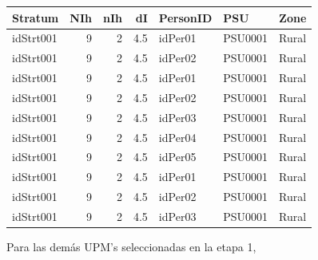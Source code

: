 \documentclass[
  12pt,
]{book}
\newenvironment{Shaded}{\begin{snugshade}}{\end{snugshade}}
\newcommand{\AttributeTok}[1]{\textcolor[rgb]{0.77,0.63,0.00}{#1}}
\newcommand{\ControlFlowTok}[1]{\textcolor[rgb]{0.13,0.29,0.53}{\textbf{#1}}}
\newcommand{\DecValTok}[1]{\textcolor[rgb]{0.00,0.00,0.81}{#1}}
\newcommand{\FunctionTok}[1]{\textcolor[rgb]{0.00,0.00,0.00}{#1}}
\newcommand{\NormalTok}[1]{#1}
\newcommand{\OtherTok}[1]{\textcolor[rgb]{0.56,0.35,0.01}{#1}}
\newcommand{\SpecialCharTok}[1]{\textcolor[rgb]{0.00,0.00,0.00}{#1}}
\newcommand{\StringTok}[1]{\textcolor[rgb]{0.31,0.60,0.02}{#1}}
\begin{document}
\begin{tabular}{l|r|r|r|l|l|l}
\hline
Stratum & NIh & nIh & dI & PersonID & PSU & Zone\\
\hline
idStrt001 & 9 & 2 & 4.5 & idPer01 & PSU0001 & Rural\\
\hline
idStrt001 & 9 & 2 & 4.5 & idPer02 & PSU0001 & Rural\\
\hline
idStrt001 & 9 & 2 & 4.5 & idPer01 & PSU0001 & Rural\\
\hline
idStrt001 & 9 & 2 & 4.5 & idPer02 & PSU0001 & Rural\\
\hline
idStrt001 & 9 & 2 & 4.5 & idPer03 & PSU0001 & Rural\\
\hline
idStrt001 & 9 & 2 & 4.5 & idPer04 & PSU0001 & Rural\\
\hline
idStrt001 & 9 & 2 & 4.5 & idPer05 & PSU0001 & Rural\\
\hline
idStrt001 & 9 & 2 & 4.5 & idPer01 & PSU0001 & Rural\\
\hline
idStrt001 & 9 & 2 & 4.5 & idPer02 & PSU0001 & Rural\\
\hline
idStrt001 & 9 & 2 & 4.5 & idPer03 & PSU0001 & Rural\\
\hline
\end{tabular}

Para las demás UPM's seleccionadas en la etapa 1,

\begin{Shaded}
\end{Shaded}
\end{document}
